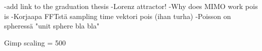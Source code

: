 -add link to the graduation thesis
-Lorenz attractor!
-Why does MIMO work pois is
-Korjaapa FFTstä sampling time vektori pois (ihan turha)
-Poisson on spheressä "unit sphere bla bla"

Gimp scaling = 500 
